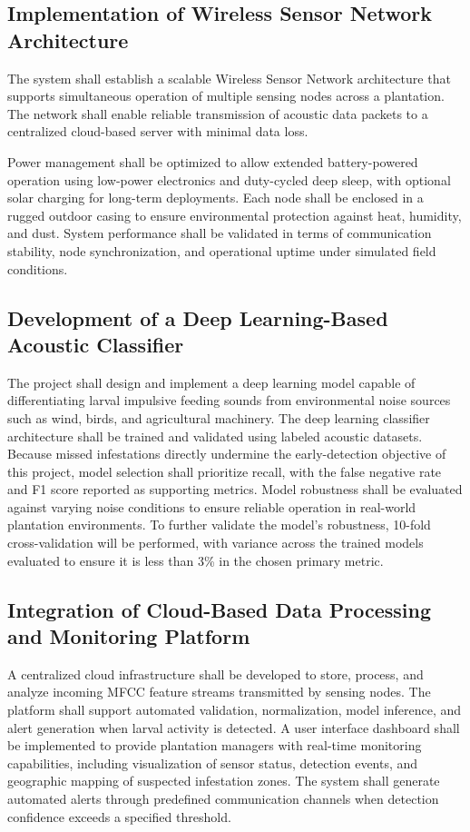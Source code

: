 \documentclass[12pt,a4paper,oneside]{memoir}
\begin{document}
\subsection{Implementation of Wireless Sensor Network Architecture}
 
The system shall establish a scalable Wireless Sensor Network architecture that supports simultaneous operation of multiple sensing nodes across a plantation. The network shall enable reliable transmission of acoustic data packets to a centralized cloud-based server with minimal data loss.
 
Power management shall be optimized to allow extended battery-powered operation using low-power electronics and duty-cycled deep sleep, with optional solar charging for long-term deployments. Each node shall be enclosed in a rugged outdoor casing to ensure environmental protection against heat, humidity, and dust. System performance shall be validated in terms of communication stability, node synchronization, and operational uptime under simulated field conditions.
 
 
\subsection{Development of a Deep Learning-Based Acoustic Classifier}
 
The project shall design and implement a deep learning model capable of differentiating larval impulsive feeding sounds from environmental noise sources such as wind, birds, and agricultural machinery. The deep learning classifier architecture shall be trained and validated using labeled acoustic datasets. Because missed infestations directly undermine the early-detection objective of this project, model selection shall prioritize recall, with the false negative rate and F1 score reported as supporting metrics. Model robustness shall be evaluated against varying noise conditions to ensure reliable operation in real-world plantation environments. To further validate the model's robustness, 10-fold cross-validation will be performed, with variance across the trained models evaluated to ensure it is less than 3\% in the chosen primary metric.
 
 
\subsection{Integration of Cloud-Based Data Processing and Monitoring Platform}
 
A centralized cloud infrastructure shall be developed to store, process, and analyze incoming MFCC feature streams transmitted by sensing nodes. The platform shall support automated validation, normalization, model inference, and alert generation when larval activity is detected. A user interface dashboard shall be implemented to provide plantation managers with real-time monitoring capabilities, including visualization of sensor status, detection events, and geographic mapping of suspected infestation zones. The system shall generate automated alerts through predefined communication channels when detection confidence exceeds a specified threshold.
 
\end{document}
